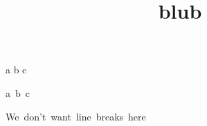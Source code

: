 \documentclass{article}
\title{blub}
\begin{document}
a b c

a~b~c

We~don't~want~line~breaks~here
\end{document}
